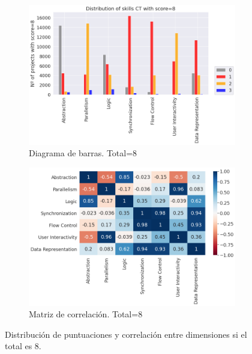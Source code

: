 \documentclass[a4paper, 12pt]{book}
\begin{document}
\begin{figure}[H]
    \centering
    \begin{subfigure}[h]{.49\textwidth} 
        \includegraphics[width=\textwidth]{img/distribucion_8_Scratch}
        \caption{Diagrama de barras. Total=8}
        \label{fig:total8}
    \end{subfigure}       
    \begin{subfigure}[h]{.49\textwidth} 
        \includegraphics[width=\textwidth]{img/corr_8_Scratch}
        \caption{Matriz de correlación. Total=8}
        \label{fig:corr8}
    \end{subfigure}
     \caption{Distribución de puntuaciones y correlación entre dimensiones si el total es 8.}
\end{figure}
\end{document}
